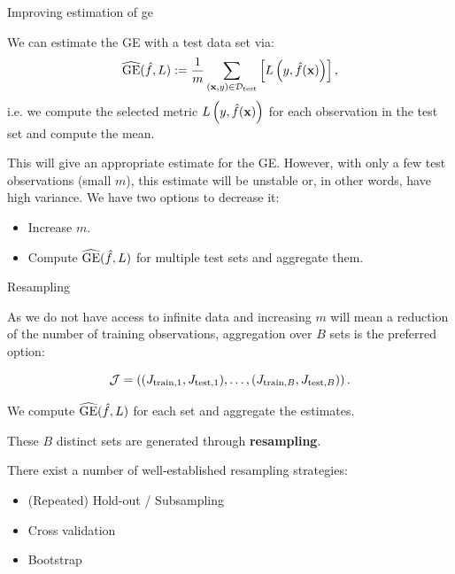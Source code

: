 \documentclass[11pt,compress,t,notes=noshow, xcolor=table]{beamer}
\begin{document}
\begin{vbframe}{Improving estimation of ge}

We can estimate the GE with a test data set via:  $$\widehat{\mathrm{GE}}(\hat{f}, L) := \frac{1}{m}\sum_{(\mathbf{x}, y) \in \mathcal{D}_{\text{test}}} \left[ L\left(y, \hat{f}(\mathbf{x})\right) \right],$$ 
i.e. we compute the selected metric $L\left(y, \hat{f}(\mathbf{x})\right)$ for each observation in the test set and compute the mean.

\vspace{0.2cm}
This will give an appropriate estimate for the GE.
However, with only a few test observations (small $m$), this estimate will be unstable or, in other words, have high variance.
We have two options to decrease it:

\begin{itemize}
\item Increase $m$.
\item Compute $\widehat{\mathrm{GE}}(\hat{f}, L)$ for multiple test sets and aggregate them.
\end{itemize}

\end{vbframe}

\begin{vbframe}{Resampling}

As we do not have access to infinite data and increasing $m$ will mean a reduction of the number of training observations, aggregation over $B$ sets is the preferred option:

$$\mathcal{J} = \left((J_{\mathrm{train},1}, J_{\mathrm{test},1}),\dots,(J_{\mathrm{train},B}, J_{\mathrm{test},B})\right).$$

We compute $\widehat{\mathrm{GE}}(\hat{f}, L)$ for each set and aggregate the estimates.

These $B$ distinct sets are generated through \textbf{resampling}.

\vspace{0.2cm}

There exist a number of well-established resampling strategies:

\begin{itemize}
\item (Repeated) Hold-out / Subsampling
\item Cross validation
\item Bootstrap
\end{itemize}

\end{vbframe}
\end{document}
